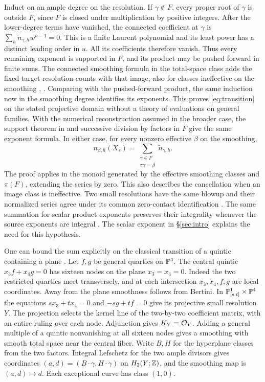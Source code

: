 Induct on an ample degree on the resolution. If $\gamma\notin F$,
every proper root of $\gamma$ is outside $F$, since $F$ is closed
under multiplication by positive integers. After the lower-degree
terms have vanished, the connected coefficient at $\gamma$ is
$\sum_h\widetilde n_{\gamma,h}w^{h-1}=0$. This is a finite Laurent
polynomial and its least power has a distinct leading order in $u$.
All its coefficients therefore vanish. Thus every remaining exponent
is supported in $F$, and its product may be pushed forward in finite
sums. The connected smoothing formula in the total-space class adds
the fixed-target resolution counts with that image, also for classes
ineffective on the smoothing \cite[\S3, proof of Theorem~3.2]{WueConifold},
\cite[Theorem~2.16 and \S3]{LW}. Comparing with the pushed-forward
product, the same induction now in the smoothing degree identifies
its exponents. This proves \eqref{eq:transition} on the stated
projective domain without a theory of evaluations on general families.
With the numerical reconstruction assumed in the broader case, the
support theorem in \cite[\S3]{WueConifold} and successive division by
factors in $F$ give the same exponent formula. In either case,
for every nonzero effective $\beta$ on the smoothing,
\[
 n_{\beta,h}(X_s)=\sum_{\substack{\gamma\in F\\\pi\gamma=\beta}}
                       \widetilde n_{\gamma,h}.
\]
The proof applies in the monoid generated by the effective smoothing
classes and $\pi(F)$, extending the series by zero. This also describes
the cancellation when an image class is ineffective. Two small
resolutions have the same blowup and their normalized series agree
under its common zero-contact identification \cite[\S3]{WueConifold}.
The same summation for scalar product exponents preserves their
integrality whenever the source exponents are integral
\cite[Corollary~3.3]{WueConifold}. The scalar exponent in
\S\ref{sec:intro} explains the need for this hypothesis.

One can bound the sum explicitly on the classical transition of a
quintic containing a plane \cite{Rossi}.
Let $f,g$ be general quartics on $\mathbb P^4$. The central quintic
$x_3f+x_4g=0$ has sixteen nodes on the plane $x_3=x_4=0$.
Indeed the two restricted quartics meet transversely, and at each
intersection $x_3,x_4,f,g$ are local coordinates. Away from the
plane smoothness follows from Bertini. In $\mathbb P^1_{[s:t]}\times\mathbb P^4$
the equations $s x_3+t x_4=0$ and $-s g+t f=0$ give its projective
small resolution $Y$. The projection selects the kernel line of the
two-by-two coefficient matrix, with an entire ruling over each node.
Adjunction gives $K_Y=\mathcal O_Y$. Adding a general multiple of a quintic
nonvanishing at all sixteen nodes gives a smoothing with smooth total
space near the central fiber. Write $B,H$ for the hyperplane classes
from the two factors. Integral Lefschetz for the two ample divisors gives
coordinates $(a,d)=(B\cdot\gamma,H\cdot\gamma)$ on $H_2(Y;\mathbb Z)$,
and the smoothing map is $(a,d)\mapsto d$. Each exceptional curve
has class $(1,0)$.

